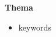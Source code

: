 \documentclass[11pt,paper=a4,fleqn,parskip=half]{scrartcl}
\title{\titel}
\newcommand{\thema}{Thema}%
\begin{document}

	\begin{center}
		\textbf{\Large \thema}\\%
		\vspace{0.6em}
		\datum
	\end{center}



	\begin{itemize}[label=\checkmark] %
		\item keywords
	\end{itemize}


	

    \printbibliography
\end{document}

